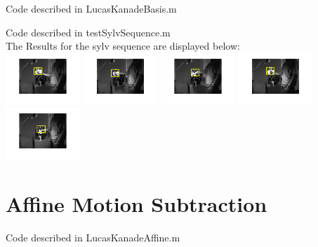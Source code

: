 \documentclass[12pt]{article}
\newenvironment{problem}[2][Problem]{\begin{trivlist}
\item[\hskip \labelsep {\bfseries #1}\hskip \labelsep {\bfseries #2.}]}{\end{trivlist}}
\begin{document}
\begin{problem}{2.2}
Code described in LucasKanadeBasis.m\\
\end{problem}

\begin{problem}{2.3}
Code described in testSylvSequence.m\\
The Results for the sylv sequence are displayed below:\\
  \includegraphics[width=0.21\textwidth]{results/2_sylv}
  \includegraphics[width=0.21\textwidth]{results/100_sylv}
  \includegraphics[width=0.21\textwidth]{results/200_sylv}
  \includegraphics[width=0.21\textwidth]{results/300_sylv}  
  \includegraphics[width=0.21\textwidth]{results/400_sylv}  

\end{problem}

\section{Affine Motion Subtraction}

\begin{problem}{3.1}
Code described in LucasKanadeAffine.m\\
\end{problem} 
\end{document}
